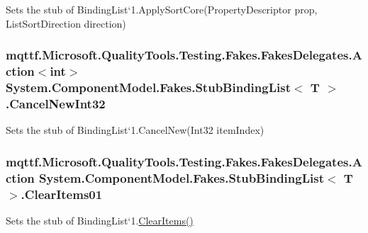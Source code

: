 Sets the stub of Binding\-List`1.Apply\-Sort\-Core(\-Property\-Descriptor prop, List\-Sort\-Direction direction)

\hypertarget{class_system_1_1_component_model_1_1_fakes_1_1_stub_binding_list_3_01_t_01_4_a90c38bfaeaf0aec93732c0e017b95143}{
\subsubsection[{Cancel\-New\-Int32}]{\setlength{\rightskip}{0pt plus 5cm}mqttf.\-Microsoft.\-Quality\-Tools.\-Testing.\-Fakes.\-Fakes\-Delegates.\-Action$<$int$>$ System.\-Component\-Model.\-Fakes.\-Stub\-Binding\-List$<$ T $>$.Cancel\-New\-Int32}}\label{class_system_1_1_component_model_1_1_fakes_1_1_stub_binding_list_3_01_t_01_4_a90c38bfaeaf0aec93732c0e017b95143}


Sets the stub of Binding\-List`1.Cancel\-New(\-Int32 item\-Index)

\hypertarget{class_system_1_1_component_model_1_1_fakes_1_1_stub_binding_list_3_01_t_01_4_aafb325890664b503f57d79747a12e8d8}{
\subsubsection[{Clear\-Items01}]{\setlength{\rightskip}{0pt plus 5cm}mqttf.\-Microsoft.\-Quality\-Tools.\-Testing.\-Fakes.\-Fakes\-Delegates.\-Action System.\-Component\-Model.\-Fakes.\-Stub\-Binding\-List$<$ T $>$.Clear\-Items01}}\label{class_system_1_1_component_model_1_1_fakes_1_1_stub_binding_list_3_01_t_01_4_aafb325890664b503f57d79747a12e8d8}


Sets the stub of Binding\-List`1.\hyperlink{class_system_1_1_component_model_1_1_fakes_1_1_stub_binding_list_3_01_t_01_4_a6f750bc8a776998c6d22dbd7398e301f}{Clear\-Items()}

